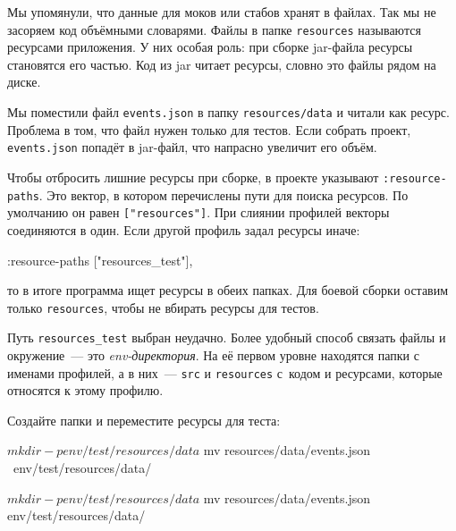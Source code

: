 Мы упомянули, что данные для моков или стабов хранят в файлах. Так мы не
засоряем код объёмными словарями. Файлы в папке \verb|resources| называются
ресурсами приложения. У них особая роль: при сборке jar-файла ресурсы становятся
его частью. Код из jar читает ресурсы, словно это файлы рядом на диске.

Мы поместили файл \verb|events.json| в папку \verb|resources/data| и читали
как ресурс. Проблема в том, что файл нужен только для тестов. Если собрать
проект, \verb|events.json| попадёт в jar-файл, что напрасно увеличит его
объём.

Чтобы отбросить лишние ресурсы при сборке, в проекте указывают
\verb|:resource-paths|. Это вектор, в котором перечислены пути для поиска
ресурсов. По умолчанию он равен \verb|["resources"]|. При слиянии профилей
векторы соединяются в один. Если другой профиль задал ресурсы иначе:

\begin{english}
  \begin{clojure}
:resource-paths ["resources_test"],
  \end{clojure}
\end{english}

\noindent
то в итоге программа ищет ресурсы в обеих папках. Для боевой сборки оставим
только \verb|resources|, чтобы не вбирать ресурсы для тестов.


Путь \verb|resources_test| выбран неудачно. Более удобный способ связать файлы
и окружение~--- это \emph{env-директория}. На её первом уровне находятся папки с
именами профилей, а в них~--- \verb|src| и \verb|resources| с~кодом и
ресурсами, которые относятся к этому профилю.

Создайте папки и переместите ресурсы для теста:

\ifx\DEVICETYPE\MOBILE

\begin{english}
  \begin{bash}
$ mkdir -p env/test/resources/data
$ mv resources/data/events.json \
     env/test/resources/data/
  \end{bash}
\end{english}

\else

\begin{english}
  \begin{bash}
$ mkdir -p env/test/resources/data
$ mv resources/data/events.json env/test/resources/data/
  \end{bash}
\end{english}

